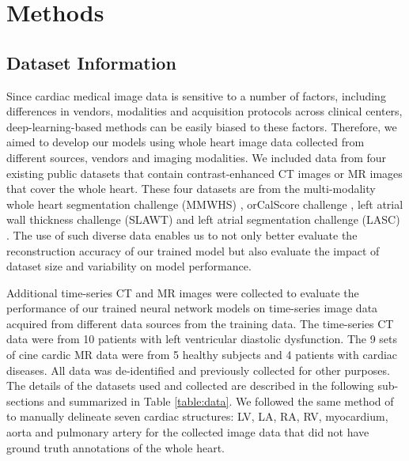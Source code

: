 \documentclass[times,review,preprint,authoryear]{elsarticle}
\begin{document}
\section{Methods}
\subsection{Dataset Information}
Since cardiac medical image data is sensitive to a number of factors, including differences in vendors, modalities and acquisition protocols across clinical centers, deep-learning-based methods can be easily biased to these factors. Therefore, we aimed to develop our models using whole heart image data collected from different sources, vendors and imaging modalities. We included data from four existing public datasets that contain contrast-enhanced CT images or MR images that cover the whole heart. These four datasets are from the multi-modality whole heart segmentation challenge (MMWHS) \cite{ZHUANG2019}, orCalScore challenge \citep{orCaScore}, left atrial wall thickness challenge (SLAWT) \citep{SLAWT} and left atrial segmentation challenge (LASC) \citep{LASC}. The use of such diverse data enables us to not only better evaluate the reconstruction accuracy of our trained model but also evaluate the impact of dataset size and variability on model performance.

Additional time-series CT and MR images were collected to evaluate the performance of our trained neural network models on time-series image data acquired from different data sources from the training data. The time-series CT data were from 10 patients with left ventricular diastolic dysfunction. The 9 sets of cine cardic MR data were from 5 healthy subjects and 4 patients with cardiac diseases.  All data was de-identified and previously collected for other purposes. The details of the datasets used and collected are described in the following sub-sections and summarized in Table \ref{table:data}. We followed the same method of \cite{ZHUANG2019} to manually delineate seven cardiac structures: LV, LA, RA, RV, myocardium, aorta and pulmonary artery for the collected image data that did not have ground truth annotations of the whole heart.
\end{document}
